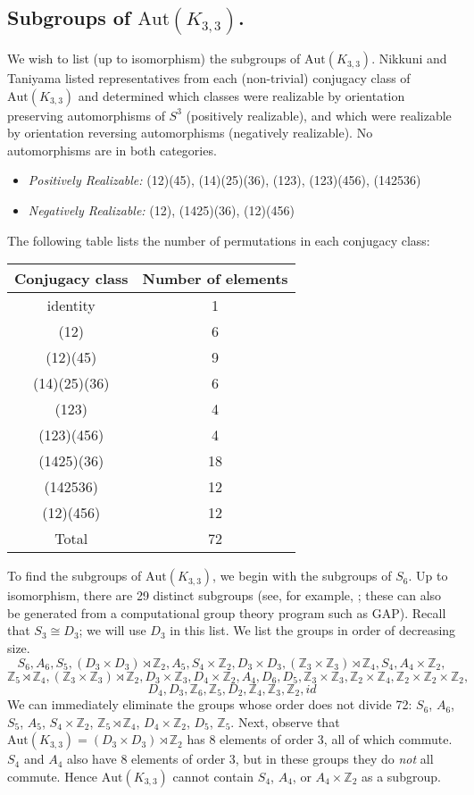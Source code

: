 \documentclass[11]{amsart}
\def\Z{\mathbb{Z}}
\newcommand{\semi}{{\rtimes}}
\def\Aut{{\mathrm{Aut}}}
\theoremstyle{definition}
\theoremstyle{remark}
\begin{document}
\subsection{Subgroups of $\Aut(K_{3,3})$.}\label{SS:K33subgps}  We wish to list (up to isomorphism) the subgroups of $\Aut(K_{3,3})$.  Nikkuni and Taniyama \cite{nt} listed representatives from each (non-trivial) conjugacy class of $\Aut(K_{3,3})$ and determined which classes were realizable by orientation preserving automorphisms of $S^3$ (positively realizable), and which were realizable by orientation reversing automorphisms (negatively realizable).  No automorphisms are in both categories.
\begin{itemize}
	\item[] {\em Positively Realizable:} (12)(45), (14)(25)(36), (123), (123)(456), (142536)
	\item[] {\em Negatively Realizable:} (12), (1425)(36), (12)(456)
\end{itemize}

The following table lists the number of permutations in each conjugacy class:

\begin{center}
\begin{tabular}{|c|c|}
\hline
Conjugacy class & Number of elements \\ \hline
identity & 1 \\
(12) & 6 \\
(12)(45) & 9 \\
(14)(25)(36) & 6 \\
(123) & 4 \\
(123)(456) & 4 \\
(1425)(36) & 18 \\
(142536) & 12 \\
(12)(456) & 12 \\ \hline
Total & 72 \\ \hline
\end{tabular}
\end{center}

To find the subgroups of $\Aut(K_{3,3})$, we begin with the subgroups of $S_6$. Up to isomorphism, there are 29 distinct subgroups (see, for example, \cite{fl}; these can also be generated from a computational group theory program such as GAP).  Recall that $S_3 \cong D_3$; we will use $D_3$ in this list.  We list the groups in order of decreasing size.
$$S_6, A_6, S_5, (D_3 \times D_3) \semi \Z_2, A_5, S_4 \times \Z_2, D_3 \times D_3, (\Z_3 \times \Z_3) \semi \Z_4, S_4, A_4 \times \Z_2,$$
$$\Z_5 \semi \Z_4, (\Z_3\times \Z_3) \semi \Z_2, D_3 \times \Z_3, D_4 \times \Z_2, A_4, D_6, D_5, \Z_3 \times \Z_3, \Z_2 \times \Z_4, \Z_2 \times \Z_2 \times \Z_2,$$
$$D_4, D_3, \Z_6, \Z_5, D_2, \Z_4, \Z_3, \Z_2, id$$
We can immediately eliminate the groups whose order does not divide 72: $S_6$, $A_6$, $S_5$, $A_5$, $S_4 \times \Z_2$, $\Z_5 \semi \Z_4$, $D_4 \times \Z_2$, $D_5$, $\Z_5$.  Next, observe that $\Aut(K_{3,3}) = (D_3 \times D_3) \semi \Z_2$ has 8 elements of order 3, all of which commute.  $S_4$ and $A_4$ also have 8 elements of order 3, but in these groups they do {\em not} all commute.  Hence $\Aut(K_{3,3})$ cannot contain $S_4$, $A_4$, or $A_4 \times \Z_2$ as a subgroup.
\end{document}

